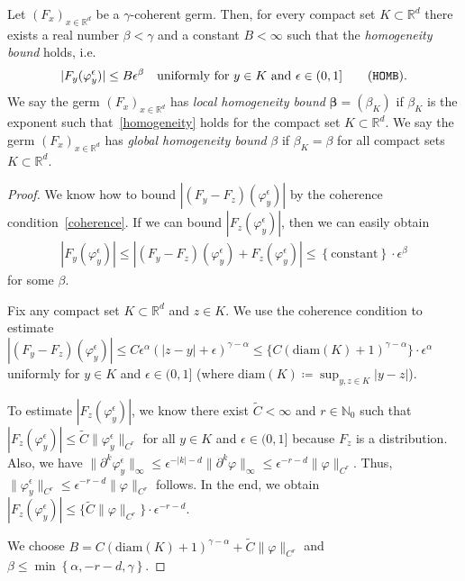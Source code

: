 \begin{lemma}
   Let \({(F_x)}_{x \in \mathbb{R}^d}\) be a \(\gamma\)-coherent germ. Then, for every compact set \(K \subset \mathbb{R}^d\) there exists a real number \(\beta < \gamma\) and a constant \(B < \infty\) such that the \emph{homogeneity bound} holds, i.e. 
   \begin{gather*}\label{homogeneity}
                |F_y(\varphi^\epsilon_y)| \leq B\epsilon^\beta \quad
                \text{uniformly for \(y \in K\) and \(\epsilon \in (0,1]\)} \tag{\texttt{HOMB}}. %
   \end{gather*}
   We say the germ \({(F_x)}_{x \in \mathbb{R}^d}\) has \emph{local homogeneity bound} \(\bm \beta = (\beta_K)\) if \(\beta_K\) is the exponent such that~\eqref{homogeneity} holds for the compact set \(K \subset \mathbb{R}^d\). We say the germ \({(F_x)}_{x \in \mathbb{R}^d}\) has \emph{global homogeneity bound} \(\beta\) if \(\beta_K = \beta\) for all compact sets \(K \subset \mathbb{R}^d\).
\end{lemma}

\begin{proof}
    We know how to bound \(|(F_y - F_z)(\varphi^\epsilon_y)|\) by the coherence condition~\eqref{coherence}. If we can bound \(|F_z(\varphi^\epsilon_y)|\), then we can easily obtain 
    \begin{align*}
        |F_y(\varphi^\epsilon_y)| \leq |(F_y - F_z)(\varphi^\epsilon_y) + F_z(\varphi^\epsilon_y)| \leq \left\{ \mathrm{constant} \right\} \cdot \epsilon^{\beta}
    \end{align*}
    for some \(\beta\).
    
    Fix any compact set \(K \subset \mathbb{R}^d\) and \(z \in K\). We use the coherence condition to estimate \(|(F_y - F_z)(\varphi^\epsilon_y)| \leq  C \epsilon^{\alpha}(|z-y|+\epsilon)^{\gamma - \alpha} \leq \{ C (\mathrm{diam}(K) + 1)^{\gamma - \alpha} \} \cdot  \epsilon^{\alpha}\) uniformly for \(y \in K\) and \(\epsilon \in (0,1]\) (where \(\mathrm{diam}(K) \coloneqq \sup_{y,z \in K}|y-z| \)). %

    To estimate \(|F_z(\varphi^\epsilon_y)|\), we know there exist \(\tilde C < \infty\) and \(r \in \mathbb{N}_0\) such that \(|F_z(\varphi^\epsilon_y)| \leq \tilde C \lVert \varphi^\epsilon_y \rVert_{C^r}\) for all \(y \in K\) and \(\epsilon \in (0,1]\) because \(F_z\) is a distribution. Also, we have \(\lVert \partial^k\varphi^\epsilon_y \rVert_\infty \leq \epsilon^{-|k|- d} \lVert \partial^k\varphi \rVert_\infty \leq \epsilon^{-r - d} \lVert \varphi \rVert_{C^r}\). Thus, \(\lVert \varphi^\epsilon_y \rVert_{C^r} \leq \epsilon^{-r-d}\lVert \varphi \rVert_{C^r}\) follows. In the end, we obtain 
    \(|F_z(\varphi^\epsilon_y)| \leq \{ \tilde C  \lVert \varphi \rVert_{C^r}  \} \cdot \epsilon^{-r-d}\).

    We choose \(B = C {(\mathrm{diam}(K) + 1)}^{\gamma - \alpha} +  \tilde C  \lVert \varphi \rVert_{C^r}  \) and \(\beta \leq \min \left\{ \alpha, -r-d, \gamma \right\}\).
\end{proof}

